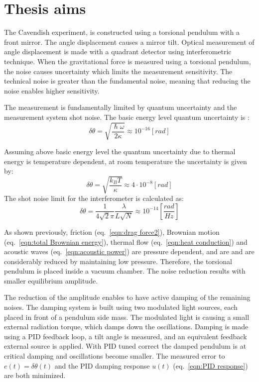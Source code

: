 \documentclass[\main/master.tex]{subfiles}
\begin{document}
\chapter{Thesis aims}\label{chapter:Thesis aims}

The Cavendish experiment, is constructed using a torsional pendulum with a front mirror. The angle displacement causes a mirror tilt. Optical measurement of angle displacement is made with a quadrant detector using interferometric technique. When the gravitational force is measured using a torsional pendulum, the noise causes uncertainty which limits the measurement sensitivity. The technical noise is greater than the fundamental noise, meaning that reducing the noise enables higher sensitivity.
\par\noindent
The measurement is fundamentally limited by quantum uncertainty and the measurement system shot noise. The basic energy level quantum uncertainty is \cite{howell2019}:
\begin{equation}
\delta\theta= \sqrt{\frac{\hslash\omega}{2\kappa}} \approx 10^{-16} [rad]    \label{eqn:basic uncertainty}
\end{equation}
\par\noindent
Assuming above basic energy level the quantum uncertainty due to thermal energy is temperature dependent, at room temperature the uncertainty is given by:
\begin{equation}
\delta\theta = \sqrt{\frac{k_B T}{\kappa}} \approx 4\cdot 10^{-8} [rad] \label{eqn:Brownian uncertainty 3}
\end{equation}
The shot noise limit for the interferometer is calculated as:
\begin{equation}
\delta\theta = \frac{1}{4\sqrt{2}\pi}\frac{\lambda}{L\sqrt{N}} \approx
10^{-14} [\frac{rad}{Hz}]    \label{eqn:shot limit}
\end{equation}
\par\noindent
As shown previously, friction (eq.~\ref{eqn:drag force2}), Brownian motion (eq.~\ref{eqn:total Brownian energy}), thermal flow (eq.~\ref{eqn:heat conduction}) and acoustic waves (eq.~\ref{eqn:acoustic power}) are pressure dependent, and are and are considerably reduced by maintaining low pressure. Therefore, the torsional pendulum is placed inside a vacuum chamber. The noise reduction results with smaller equilibrium amplitude.
\par\noindent
The reduction of the amplitude enables to have active damping of the remaining noises. The damping system is built using two modulated light sources, each placed in front of a pendulum side mass. The modulated light is causing a small external radiation torque, which damps down the oscillations. Damping is made using a PID feedback loop, a tilt angle is measured, and an equivalent feedback external source is applied. With PID tuned correct the damped pendulum is at critical damping and oscillations become smaller. The measured error to $e(t) = \delta\theta(t)$ and the PID damping response $u(t)$ (eq.~\ref{eqn:PID response}) are both minimized. 
\end{document}
